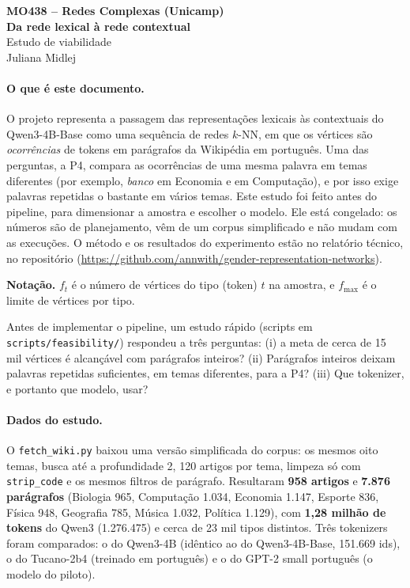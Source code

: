 \documentclass[11pt,a4paper]{article}
\newcommand{\cod}[1]{\texttt{#1}}              %
\newcommand{\repo}{https://github.com/annwith/gender-representation-networks}
\begin{document}
\begin{center}
    {\large\bfseries MO438 -- Redes Complexas (Unicamp)}\\[4pt]
    {\LARGE\bfseries Da rede lexical à rede contextual}\\[3pt]
    {\large Estudo de viabilidade}\\[8pt]
    Juliana Midlej
\end{center}

\paragraph{O que é este documento.} O projeto representa a passagem das representações
lexicais às contextuais do Qwen3-4B-Base como uma sequência de redes $k$-NN, em que os vértices
são \emph{ocorrências} de tokens em parágrafos da Wikipédia em português. Uma das perguntas, a
P4, compara as ocorrências de uma mesma palavra em temas diferentes (por exemplo,
\emph{banco} em Economia e em Computação), e por isso exige palavras repetidas o bastante em
vários temas. Este estudo foi feito antes do pipeline, para dimensionar a amostra e escolher o
modelo. Ele está congelado: os números são de planejamento, vêm de um corpus simplificado e não
mudam com as execuções. O método e os resultados do experimento estão no relatório técnico,
no repositório (\url{\repo}).

\textbf{Notação.} $f_t$ é o número de vértices do tipo (token) $t$ na amostra, e $f_{\max}$ é o
limite de vértices por tipo.

Antes de implementar o pipeline, um estudo rápido (scripts em \cod{scripts/feasibility/})
respondeu a três perguntas: (i) a meta de cerca de 15 mil vértices é alcançável com parágrafos
inteiros? (ii) Parágrafos inteiros deixam palavras repetidas suficientes, em temas diferentes,
para a P4? (iii) Que tokenizer, e portanto que modelo, usar?

\paragraph{Dados do estudo.} O \cod{fetch\_wiki.py} baixou uma versão simplificada do corpus:
os mesmos oito temas, busca até a profundidade 2, 120 artigos por tema, limpeza só com
\cod{strip\_code} e os mesmos filtros de parágrafo. Resultaram \textbf{958 artigos} e
\textbf{7.876 parágrafos} (Biologia 965, Computação 1.034, Economia 1.147, Esporte 836, Física
948, Geografia 785, Música 1.032, Política 1.129), com \textbf{1,28 milhão de tokens} do
Qwen3 (1.276.475) e cerca de 23 mil tipos distintos. Três tokenizers foram comparados: o do
Qwen3-4B (idêntico ao do Qwen3-4B-Base, 151.669 ids), o do Tucano-2b4 (treinado em português) e
o do GPT-2 small português (o modelo do piloto).
\end{document}
